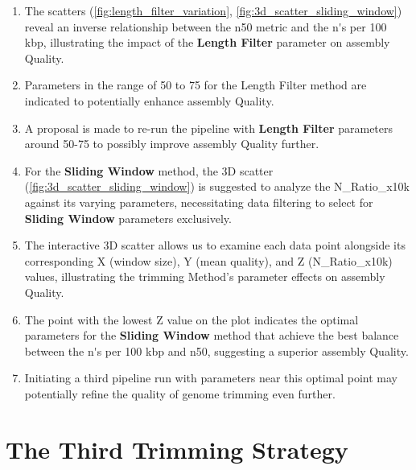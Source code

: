 \begin{enumerate}
  \item The \gls{scatter}s (\autoref{fig:length_filter_variation}, \autoref{fig:3d_scatter_sliding_window}) reveal an inverse relationship between the \gls{n50} metric and the \gls{n's per 100 kbp}, illustrating the impact of the \textbf{Length Filter} parameter on \gls{assembly} Quality.
  \item Parameters in the range of 50 to 75 for the Length Filter method are indicated to potentially enhance \gls{assembly} Quality.
  \item A proposal is made to re-run the pipeline with \textbf{Length Filter} parameters around 50-75 to possibly improve \gls{assembly} Quality further.
  \item For the \textbf{Sliding Window} method, the 3D \gls{scatter} (\autoref{fig:3d_scatter_sliding_window}) is suggested to analyze the N\_Ratio\_x10k against its varying parameters, necessitating data filtering to select for \textbf{Sliding Window} parameters exclusively.
  \item The interactive 3D \gls{scatter} allows us to examine each data point alongside its corresponding X (window size), Y (mean quality), and Z (N\_Ratio\_x10k) values, illustrating the \gls{trimming} Method's parameter effects on \gls{assembly} Quality.
  \item The point with the lowest Z value on the plot indicates the optimal parameters for the \textbf{Sliding Window} method that achieve the best balance between the \gls{n's per 100 kbp} and \gls{n50}, suggesting a superior \gls{assembly} Quality.
  \item Initiating a third pipeline run with parameters near this optimal point may potentially refine the quality of \gls{genome} \gls{trimming} even further.
\end{enumerate}





\section{The Third Trimming Strategy }  \label{sec:3rd_trimming_stratrgy}


